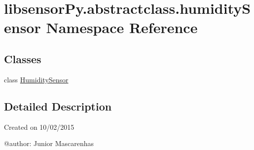 \hypertarget{namespacelibsensorPy_1_1abstractclass_1_1humiditySensor}{}\section{libsensor\+Py.\+abstractclass.\+humidity\+Sensor Namespace Reference}
\label{namespacelibsensorPy_1_1abstractclass_1_1humiditySensor}
\subsection*{Classes}
\begin{DoxyCompactItemize}
\item 
class \hyperlink{classlibsensorPy_1_1abstractclass_1_1humiditySensor_1_1HumiditySensor}{Humidity\+Sensor}
\end{DoxyCompactItemize}


\subsection{Detailed Description}
\begin{DoxyVerb}Created on 10/02/2015

@author: Junior Mascarenhas
\end{DoxyVerb}
 